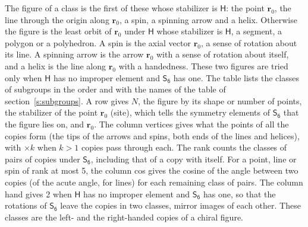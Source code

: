 \documentclass[10pt,a4paper]{article}
\numberwithin{equation}{section}
\newcommand{\grp}[1]{\mathsf{#1}}
\newcommand{\pointr}{\mathbf{r}}
\begin{document}
\leavevmode\label{n:head.figure}The figure of a class is the first of these whose stabilizer is $\grp{H}$: the point $\pointr_0$, the line through the origin along $\pointr_0$, a spin, a spinning arrow and a helix. Otherwise the figure is the least orbit of $\pointr_0$ under $\grp{H}$ whose stabilizer is $\grp{H}$, a segment, a polygon or a polyhedron. A spin is the axial vector $\pointr_0$, a sense of rotation about its line. A spinning arrow is the arrow $\pointr_0$ with a sense of rotation about itself, and a helix is the line along $\pointr_0$ with a handedness. These two figures are tried only when $\grp{H}$ has no improper element and $\grp{S_{6}}$ has one. The table lists the classes of subgroups in the order and with the names of the table of section~\ref{s:subgroups}. \label{n:head.site}A row gives $N$, the figure by its shape or number of points, the stabilizer of the point $\pointr_0$ (site), which tells the symmetry elements of $\grp{S_{6}}$ that the figure lies on, and $\pointr_0$. \label{n:head.vertices}The column vertices gives what the points of all the copies form (the tips of the arrows and spins, both ends of the lines and helices), with ${\times}k$ when $k > 1$ copies pass through each. \label{n:head.rank}The rank counts the classes of pairs of copies under $\grp{S_{6}}$, including that of a copy with itself. \label{n:head.cos}For a point, line or spin of rank at most 5, the column cos gives the cosine of the angle between two copies (of the acute angle, for lines) for each remaining class of pairs. \label{n:head.hand}The column hand gives 2 when $\grp{H}$ has no improper element and $\grp{S_{6}}$ has one, so that the rotations of $\grp{S_{6}}$ leave the copies in two classes, mirror images of each other. These classes are the left- and the right-handed copies of a chiral figure.
\end{document}
